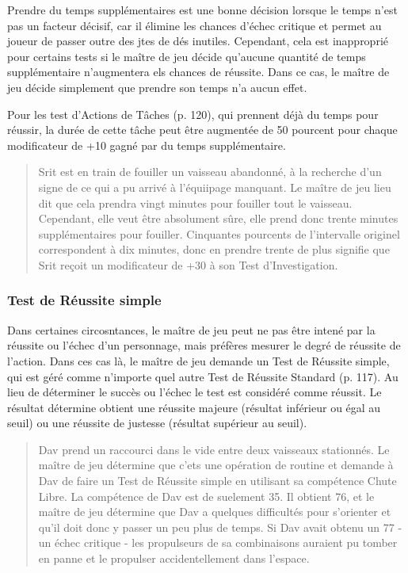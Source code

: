 Prendre du temps supplémentaires est une bonne décision lorsque le temps n'est pas un facteur décisif, car il élimine les chances d'échec critique et permet au joueur de passer outre des jtes de dés inutiles. Cependant, cela est inapproprié pour certains tests si le maître de jeu décide qu'aucune quantité de temps supplémentaire n'augmentera els chances de réussite. Dans ce cas, le maître de jeu décide simplement que prendre son temps n'a aucun effet. 

Pour les test d'Actions de Tâches (p. 120), qui prennent déjà du temps pour réussir, la durée de cette tâche peut être augmentée de 50 pourcent pour chaque modificateur de +10 gagné par du temps supplémentaire. 

\begin{quotation} Srit est en train de fouiller un vaisseau abandonné, à la recherche d'un signe de ce qui a pu arrivé à l'équiipage manquant. Le maître de jeu lieu dit que cela prendra vingt minutes pour fouiller tout le vaisseau. Cependant, elle veut être absolument sûre, elle prend donc trente minutes supplémentaires pour fouiller. Cinquantes pourcents de l'intervalle originel correspondent à dix minutes, donc en prendre trente de plus signifie que Srit reçoit un modificateur de +30 à son Test d'Investigation. \end{quotation} 

\subsubsection{Test de Réussite simple} \label{sec:simple-success-tests} 

Dans certaines circosntances, le maître de jeu peut ne pas être intené par la réussite ou l'échec d'un personnage, mais préfères mesurer le degré de réussite de l'action. Dans ces cas là, le maître de jeu demande un Test de Réussite simple, qui est géré comme n'importe quel autre Test de Réussite Standard (p. 117). Au lieu de déterminer le succès ou l'échec le test est considéré comme réussit. Le résultat détermine obtient une réussite majeure (résultat inférieur ou égal au seuil) ou une réussite de justesse (résultat supérieur au seuil). 

\begin{quotation} Dav prend un raccourci dans le vide entre deux vaisseaux stationnés. Le maître de jeu détermine que c'ets une opération de routine et demande à Dav de faire un Test de Réussite simple en utilisant sa compétence Chute Libre. La compétence de Dav est de suelement 35. Il obtient 76, et le maître de jeu détermine que Dav a quelques difficultés pour s'orienter et qu'il doit donc y passer un peu plus de temps. Si Dav avait obtenu un 77 - un échec critique - les propulseurs de sa combinaisons auraient pu tomber en panne et le propulser accidentellement dans l'espace. \end{quotation} 

